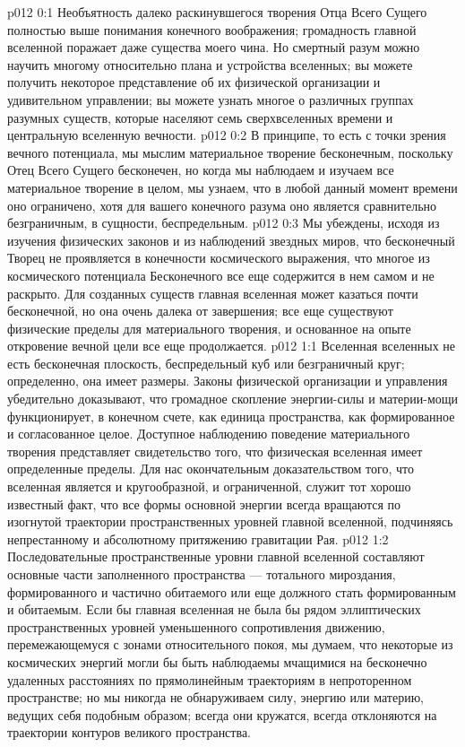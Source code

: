 \author{Совершенствователь Мудрости}
\vs p012 0:1 Необъятность далеко раскинувшегося творения Отца Всего Сущего полностью выше понимания конечного воображения; громадность главной вселенной поражает даже существа моего чина. Но смертный разум можно научить многому относительно плана и устройства вселенных; вы можете получить некоторое представление об их физической организации и удивительном управлении; вы можете узнать многое о различных группах разумных существ, которые населяют семь сверхвселенных времени и центральную вселенную вечности.
\vs p012 0:2 В принципе, то есть с точки зрения вечного потенциала, мы мыслим материальное творение бесконечным, поскольку Отец Всего Сущего бесконечен, но когда мы наблюдаем и изучаем все материальное творение в целом, мы узнаем, что в любой данный момент времени оно ограничено, хотя для вашего конечного разума оно является сравнительно безграничным, в сущности, беспредельным.
\vs p012 0:3 Мы убеждены, исходя из изучения физических законов и из наблюдений звездных миров, что бесконечный Творец не проявляется в конечности космического выражения, что многое из космического потенциала Бесконечного все еще содержится в нем самом и не раскрыто. Для созданных существ главная вселенная может казаться почти бесконечной, но она очень далека от завершения; все еще существуют физические пределы для материального творения, и основанное на опыте откровение вечной цели все еще продолжается.
\vs p012 1:1 Вселенная вселенных не есть бесконечная плоскость, беспредельный куб или безграничный круг; определенно, она имеет размеры. Законы физической организации и управления убедительно доказывают, что громадное скопление энергии\hyp{}силы и материи\hyp{}мощи функционирует, в конечном счете, как единица пространства, как формированное и согласованное целое. Доступное наблюдению поведение материального творения представляет свидетельство того, что физическая вселенная имеет определенные пределы. Для нас окончательным доказательством того, что вселенная является и кругообразной, и ограниченной, служит тот хорошо известный факт, что все формы основной энергии всегда вращаются по изогнутой траектории пространственных уровней главной вселенной, подчиняясь непрестанному и абсолютному притяжению гравитации Рая.
\vs p012 1:2 Последовательные пространственные уровни главной вселенной составляют основные части заполненного пространства --- тотального мироздания, формированного и частично обитаемого или еще должного стать формированным и обитаемым. Если бы главная вселенная не была бы рядом эллиптических пространственных уровней уменьшенного сопротивления движению, перемежающемуся с зонами относительного покоя, мы думаем, что некоторые из космических энергий могли бы быть наблюдаемы мчащимися на бесконечно удаленных расстояниях по прямолинейным траекториям в непроторенном пространстве; но мы никогда не обнаруживаем силу, энергию или материю, ведущих себя подобным образом; всегда они кружатся, всегда отклоняются на траектории контуров великого пространства.
